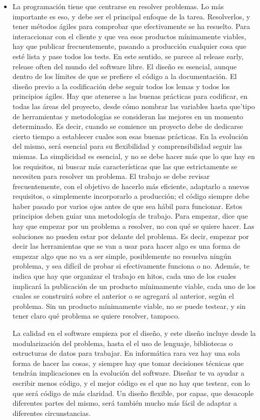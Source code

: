 \begin{itemize}
    \item 

La programación tiene que centrarse en resolver problemas. 
Lo más importante es eso, y debe ser el principal enfoque 
de la tarea. Resolverlos, y tener métodos ágiles para comprobar 
que efectivamente se ha resuelto.
Para interaccionar con el cliente y que vea esos productos 
mínimamente viables, hay que publicar frecuentemente, 
pasando a producción cualquier cosa que esté lista y 
pase todos los tests. En este sentido, se parece al 
release early, release often del mundo del software libre.
El diseño es esencial, aunque dentro de los límites de 
que se prefiere el código a la documentación. El diseño 
previo a la codificación debe seguir todos los lemas y 
todos los principios ágiles.
Hay que atenerse a las buenas prácticas para codificar, 
en todas las áreas del proyecto, desde cómo nombrar 
las variables hasta que’tipo de herramientas y metodologías 
se consideran las mejores en un momento determinado. 
Es decir, cuando se comience un proyecto debe de 
dedicarse cierto tiempo a establecer cuales son 
esas buenas prácticas. En la evolución del mismo, 
será esencial para su flexibilidad y comprensibilidad seguir las mismas.
La simplicidad es esencial, y no se debe hacer más 
que lo que hay en los requisitos, ni buscar más 
características que las que estrictamente se necesiten 
para resolver un problema.
El trabajo se debe revisar frecuentemente, con el objetivo 
de hacerlo más eficiente, adaptarlo a nuevos requisitos, 
o simplemente incorporarlo a producción; el código siempre 
debe haber pasado por varios ojos antes de que sea hábil para funcionar.
Estos principios deben guiar una metodología de trabajo. 
Para empezar, dice que hay que empezar por un problema a 
resolver, no con qué se quiere hacer. Las soluciones no 
pueden estar por delante del problema. Es decir, empezar 
por decir las herramientas que se van a usar para hacer 
algo es una forma de empezar algo que no va a ser simple, 
posiblemente no resuelva ningún problema, y sea difícil 
de probar si efectivamente funciona o no. Además, te 
indica que hay que organizar el trabajo en hitos, 
cada uno de los cuales implicará la publicación de 
un producto mínimamente viable, cada uno de los 
cuales se construirá sobre el anterior o se agregará 
al anterior, según el problema. Sin un producto 
mínimamente viable, no se puede testear, y sin tener 
claro qué problema se quiere resolver, tampoco.

La calidad en el software empieza por el diseño, y este 
diseño incluye desde la modularización del problema, 
hasta el el uso de lenguaje, bibliotecas o estructuras 
de datos para trabajar. En informática rara vez hay 
una sola forma de hacer las cosas, y siempre hay que 
tomar decisiones técnicas que tendrán implicaciones 
en la evolución del software. Diseñar te va ayudar 
a escribir menos código, y el mejor código es el 
que no hay que testear, con lo que será código de 
más claridad. Un diseño flexible, por capas, que 
desacople diferentes partes del mismo, será también 
mucho más fácil de adaptar a diferentes circunstancias.


\end{itemize}
